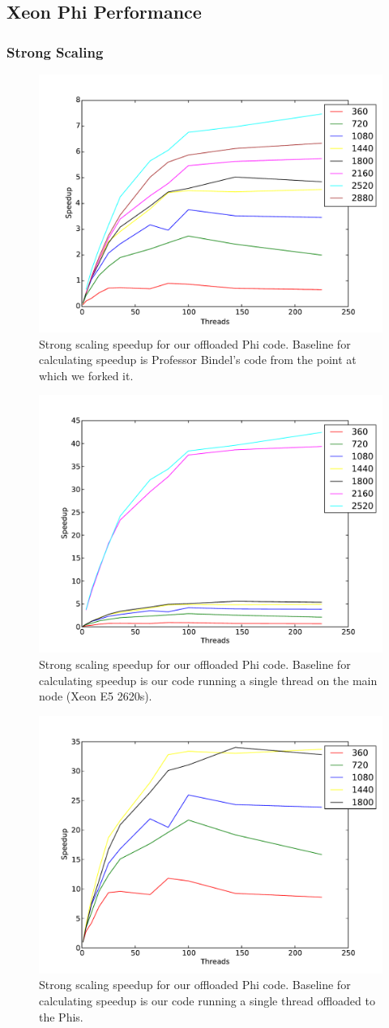 \documentclass[11pt]{article}
\begin{document}
\subsection{Xeon Phi Performance}

\subsubsection{Strong Scaling}
\begin{figure}[h!]
\includegraphics[width=0.5\linewidth]{mic_strong_bindel_baseline.pdf}
\caption{Strong scaling speedup for our offloaded Phi code. Baseline for calculating speedup is Professor Bindel's code from the point at which we forked it.}
\end{figure}

\begin{figure}[h!]
\includegraphics[width=0.5\linewidth]{mic_strong_e5_baseline.pdf}
\caption{Strong scaling speedup for our offloaded Phi code. Baseline for calculating speedup is our code running a single thread on the main node (Xeon E5 2620s).}
\end{figure}

\begin{figure}[h!]
\includegraphics[width=0.5\linewidth]{mic_strong_mic_baseline.pdf}
\caption{Strong scaling speedup for our offloaded Phi code. Baseline for calculating speedup is our code running a single thread offloaded to the Phis.}
\end{figure}
\end{document}
